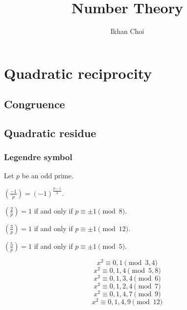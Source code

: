 \documentclass{../../large}
\begin{document}
\title{Number Theory}
\author{Ikhan Choi}
\maketitle
\tableofcontents

\part{Quadratic reciprocity}

\chapter{Congruence}

\section{}

\begin{prb}
	
\end{prb}

\chapter{Quadratic residue}

\section{Legendre symbol}
\begin{prb}
Let $p$ be an odd prime.
\begin{parts}
\item $\left(\frac{-1}p\right)=(-1)^{\frac{p-1}2}$.
\item $\left(\frac2p\right)=1$ if and only if $p\equiv\pm1\pmod8$.
\item $\left(\frac3p\right)=1$ if and only if $p\equiv\pm1\pmod{12}$.
\item $\left(\frac5p\right)=1$ if and only if $p\equiv\pm1\pmod5.$
\end{parts}
\end{prb}
\begin{prb}
\[x^2\equiv0,1\pmod{3,4}\]
\[x^2\equiv0,1,4\pmod{5,8}\]
\[x^2\equiv0,1,3,4\pmod{6}\]
\[x^2\equiv0,1,2,4\pmod{7}\]
\[x^2\equiv0,1,4,7\pmod{9}\]
\[x^2\equiv0,1,4,9\pmod{12}\]
\end{prb}

\begin{prb}
\end{prb}
\end{document}
